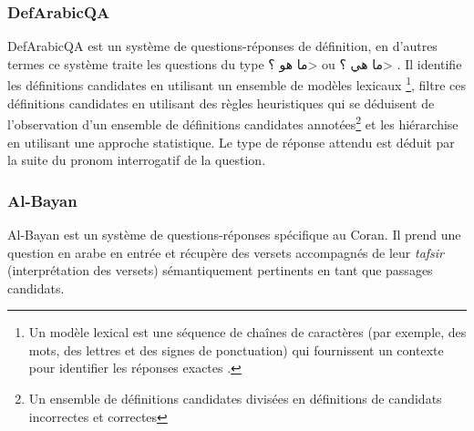 \subsubsection{DefArabicQA}
DefArabicQA \cite{ArabicQA}  est un système de questions-réponses de définition, en d'autres termes ce système traite les questions du type \<ما هو ؟> ou \<ما هي ؟> . Il identifie les définitions candidates en utilisant un ensemble de modèles lexicaux \footnote{Un modèle lexical est une séquence de chaînes de caractères (par exemple, des mots, des lettres et des signes de ponctuation) qui fournissent un contexte pour identifier les réponses exactes \cite{ArabicQA}.}, filtre ces définitions candidates en utilisant des règles heuristiques qui se déduisent de l'observation d'un ensemble de définitions candidates annotées\footnote{Un ensemble de définitions candidates divisées en définitions de candidats incorrectes et correctes} et les hiérarchise en utilisant une approche statistique. Le type de réponse attendu est déduit par la suite du pronom interrogatif de la question.

\subsubsection{Al-Bayan}
Al-Bayan \cite{Albayan} est un système de questions-réponses spécifique au Coran. Il prend une question en arabe en entrée et récupère des versets  accompagnés de leur \textit{tafsir} (interprétation des versets) sémantiquement pertinents en tant que passages candidats.

